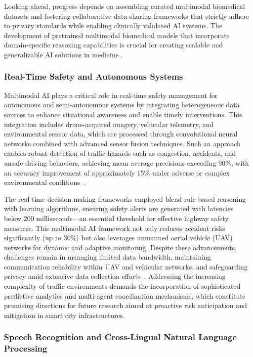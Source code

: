 \documentclass[sigconf]{acmart}
\begin{document}
Looking ahead, progress depends on assembling curated multimodal biomedical datasets and fostering collaborative data-sharing frameworks that strictly adhere to privacy standards while enabling clinically validated AI systems. The development of pretrained multimodal biomedical models that incorporate domain-specific reasoning capabilities is crucial for creating scalable and generalizable AI solutions in medicine \cite{ref12}.

\subsubsection{Real-Time Safety and Autonomous Systems}

Multimodal AI plays a critical role in real-time safety management for autonomous and semi-autonomous systems by integrating heterogeneous data sources to enhance situational awareness and enable timely interventions. This integration includes drone-acquired imagery, vehicular telemetry, and environmental sensor data, which are processed through convolutional neural networks combined with advanced sensor fusion techniques. Such an approach enables robust detection of traffic hazards such as congestion, accidents, and unsafe driving behaviors, achieving mean average precisions exceeding 90\%, with an accuracy improvement of approximately 15\% under adverse or complex environmental conditions~\cite{ref27}.

The real-time decision-making frameworks employed blend rule-based reasoning with learning algorithms, ensuring safety alerts are generated with latencies below 200 milliseconds—an essential threshold for effective highway safety measures. This multimodal AI framework not only reduces accident risks significantly (up to 30\%) but also leverages unmanned aerial vehicle (UAV) networks for dynamic and adaptive monitoring. Despite these advancements, challenges remain in managing limited data bandwidth, maintaining communication reliability within UAV and vehicular networks, and safeguarding privacy amid extensive data collection efforts~\cite{ref27}. Addressing the increasing complexity of traffic environments demands the incorporation of sophisticated predictive analytics and multi-agent coordination mechanisms, which constitute promising directions for future research aimed at proactive risk anticipation and mitigation in smart city infrastructures.

\subsubsection{Speech Recognition and Cross-Lingual Natural Language Processing}
\end{document}
